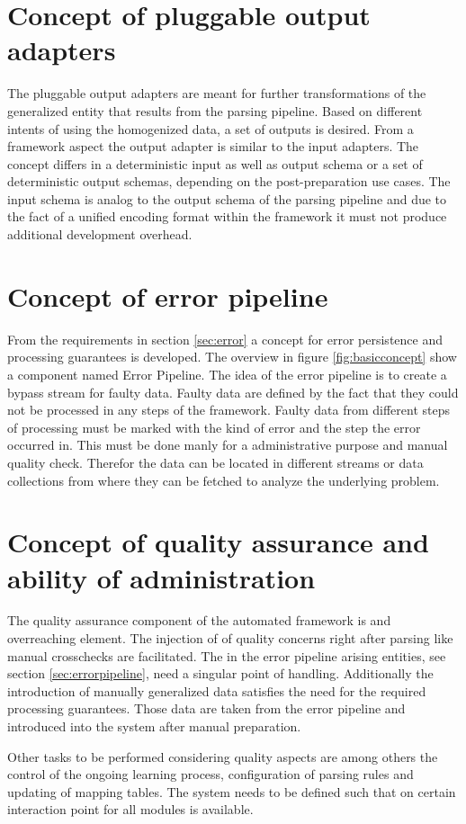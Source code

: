 \section{Concept of pluggable output adapters\label{sec:componentsoutput}}

The pluggable output adapters are meant for further transformations of the generalized entity that results from the parsing pipeline. Based on different intents of using the homogenized data, a set of outputs is desired. From a framework aspect the output adapter is similar to the input adapters. The concept differs in a deterministic input as well as output schema or a set of deterministic output schemas, depending on the post-preparation use cases. The input schema is analog to the output schema of the parsing pipeline and due to the fact of a unified encoding format within the framework it must not produce additional development overhead. 

\section{Concept of error pipeline \label{sec:errorpipeline}}

From the requirements in section \ref{sec:error} a concept for error persistence and processing guarantees is developed. The overview in figure \ref{fig:basicconcept} show a component named Error Pipeline. The idea of the error pipeline is to create a bypass stream for faulty data. Faulty data are defined by the fact that they could not be processed in any steps of the framework. Faulty data from different steps of processing must be marked with the kind of error and the step the error occurred in. This must be done manly for a administrative purpose and manual quality check. Therefor the data can be located in different streams or data collections from where they can be fetched to analyze the underlying problem.

\section{Concept of quality assurance and ability of administration}

The quality assurance component of the automated framework is and overreaching element. The injection of of quality concerns right after parsing like manual crosschecks are facilitated. The in the error pipeline arising entities, see section \ref{sec:errorpipeline}, need a singular point of handling. Additionally the introduction of manually generalized data satisfies the need for the required processing guarantees. Those data are taken from the error pipeline and introduced into the system after manual preparation. 

Other tasks to be performed considering quality aspects are among others the control of the ongoing learning process, configuration of parsing rules and updating of mapping tables. The system needs to be defined such that on certain interaction point for all modules is available.